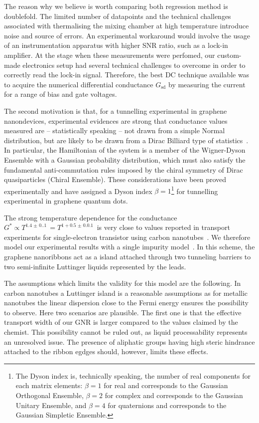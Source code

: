 The reason why we believe is worth comparing both regression method is doublefold. The limited number of datapoints and the technical challenges associated with thermalising the mixing chamber at high temperature introduce noise and source of errors. An experimental workaround would involve the usage of an instrumentation apparatus with higher \gls{SNR} ratio, such as a lock-in amplifier. At the stage when these measurements were perfomed, our custom-made electronics setup had several technical challenges to overcome in order to correctly read the lock-in signal. Therefore, the best DC technique available was to acquire the numerical differential conductance $G_\textrm{sd}$ by measuring the current for a range of bias and gate voltages.

The second motivation is that, for a tunnelling experimental in graphene nanondevices, experimental evidences are strong that conductance values measured are -- statistically speaking -- not drawn from a simple Normal distribution, but are likely to be drawn from a Dirac Billiard type of statistics~\cite{da2019klein, ponomarenko2008chaotic}. In particular, the Hamiltonian of the system is a member of the Wigner-Dyson Ensemble with a Gaussian probability distribution, which must also satisfy the fundamental anti-commutation rules imposed by the chiral symmetry of Dirac quasiparticles (Chiral Ensemble). These considerations have been proved experimentally and have assigned a Dyson index $\beta = 1$\footnote[2]{The Dyson index is, technically speaking, the number of real components for each matrix elements: $\beta = 1$ for real and corresponds to the Gaussian Orthogonal Ensemble, $\beta = 2$ for complex and corresponds to the Gaussian Unitary Ensemble, and $\beta = 4$ for quaternions and corresponds to the Gaussian Simpletic Ensemble.} for tunnelling experimental in graphene quantum dots.

The strong temperature dependence for the conductance $G^* \propto T^{\SI[separate-uncertainty = true]{1.4(0.1)}{}} = T^{1+\SI[separate-uncertainty = true]{0.5(0.01)}{}}$ is very close to values reported in transport experiments for single-electron transistor using carbon nanotubes~\cite{postma2001carbon}. We therefore model our experimental results with a single impurity model~\cite{thorwart2002correlated}. In this scheme, the graphene nanoribbons act as a island attached through two tunneling barriers to two semi-infinite Luttinger liquids represented by the leads.


The assumptions which limits the validity for this model are the following. In carbon nanotubes a Luttinger island is a reasonable assumptions as for metallic nanotubes the linear dispersion close to the Fermi energy ensures the possibility to observe. Here two scenarios are plausible. The first one is that the effective transport width of our GNR is larger compared to the values claimed by the chemist. This possibility cannot be ruled out, as liquid processability represents an unresolved issue. The presence of aliphatic groups having high steric hindrance attached to the ribbon egdges should, however, limits these effects.

